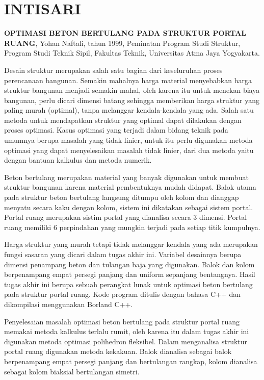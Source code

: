 \chapter*{INTISARI}

\noindent\textbf{OPTIMASI BETON BERTULANG PADA STRUKTUR PORTAL RUANG},
Yohan Naftali, tahun 1999, Peminatan Program Studi Struktur, Program Studi
Teknik Sipil, Fakultas Teknik, Universitas Atma Jaya Yogyakarta.

\bigskip
\noindent
Desain struktur merupakan salah satu bagian dari keseluruhan proses
perencanaan bangunan. Semakin mahalnya harga material menyebabkan harga
struktur bangunan menjadi semakin mahal, oleh karena itu untuk menekan biaya
bangunan, perlu dicari dimensi batang sehingga memberikan harga struktur
yang paling murah (optimal), tanpa melanggar kendala-kendala yang ada. Salah
satu metoda untuk mendapatkan struktur yang optimal dapat dilakukan dengan
proses optimasi. Kasus optimasi yang terjadi dalam bidang teknik pada
umumnya berupa masalah yang tidak linier, untuk itu perlu digunakan metoda
optimasi yang dapat menyelesaikan masalah tidak linier, dari dua metoda
yaitu dengan bantuan kalkulus dan metoda numerik.

Beton bertulang merupakan material yang banyak digunakan untuk membuat
struktur bangunan karena material pembentuknya mudah didapat. Balok utama
pada struktur beton bertulang langsung ditumpu oleh kolom dan dianggap
menyatu secara kaku dengan kolom, sistem ini dikatakan sebagai sistem
portal. Portal ruang merupakan sistim portal yang dianalisa secara 3
dimensi. Portal ruang memiliki 6 perpindahan yang mungkin terjadi pada
setiap titik kumpulnya.

Harga struktur yang murah tetapi tidak melanggar kendala yang ada merupakan
fungsi sasaran yang dicari dalam tugas akhir ini. Variabel desainnya berupa
dimensi penampang beton dan tulangan baja yang digunakan. Balok dan kolom
berpenampang empat persegi panjang dan uniform sepanjang bentangnya. Hasil
tugas akhir ini berupa sebuah perangkat lunak untuk optimasi beton bertulang
pada struktur portal ruang. Kode program ditulis dengan bahasa C++ dan
dikompilasi menggunakan Borland C++.

Penyelesaian masalah optimasi beton bertulang pada struktur portal ruang
memakai metoda kalkulus terlalu rumit, oleh karena itu dalam tugas akhir ini
digunakan metoda optimasi polihedron fleksibel. Dalam menganalisa struktur
portal ruang digunakan metoda kekakuan. Balok dianalisa sebagai balok
berpenampang empat persegi panjang dan bertulangan rangkap, kolom dianalisa
sebagai kolom biaksial bertulangan simetri.

